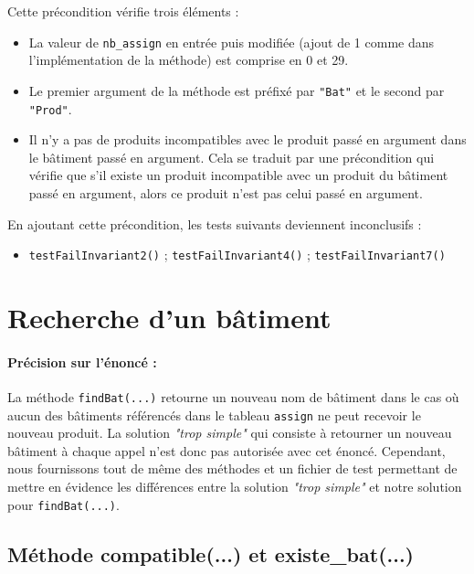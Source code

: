 \documentclass{article}
\begin{document}
\noindent
Cette précondition vérifie trois éléments :
\begin{itemize}
\item La valeur de \texttt{nb\_assign} en entrée puis modifiée (ajout de 1 comme dans l'implémentation de la méthode) est comprise en 0 et 29.
\item Le premier argument de la méthode est préfixé par \texttt{"Bat"} et le second par \texttt{"Prod"}.
\item Il n'y a pas de produits incompatibles avec le produit passé en argument dans le bâtiment passé en argument. Cela se traduit par une précondition qui vérifie que s'il existe un produit incompatible avec un produit du bâtiment passé en argument, alors ce produit n'est pas celui passé en argument.
\end{itemize}

\vspace{0.3cm}
\noindent
En ajoutant cette précondition, les tests suivants deviennent inconclusifs :
\begin{itemize}
\renewcommand{\labelitemi}{$\rightarrow$} 
\item \texttt{testFailInvariant2()} ; \texttt{testFailInvariant4()} ; \texttt{testFailInvariant7()}
\end{itemize}

\section{Recherche d'un bâtiment}

\paragraph{Précision sur l'énoncé :} La méthode \texttt{findBat(...)} retourne un nouveau nom de bâtiment dans le cas où aucun des bâtiments référencés dans le tableau \texttt{assign} ne peut recevoir le nouveau produit. La solution \textit{"trop simple"} qui consiste à retourner un nouveau bâtiment à chaque appel n'est donc pas autorisée avec cet énoncé. Cependant, nous fournissons tout de même des méthodes et un fichier de test permettant de mettre en évidence les différences entre la solution \textit{"trop simple"} et notre solution pour \texttt{findBat(...)}.

\subsection{Méthode compatible(...) et existe\_bat(...)}
\end{document}

